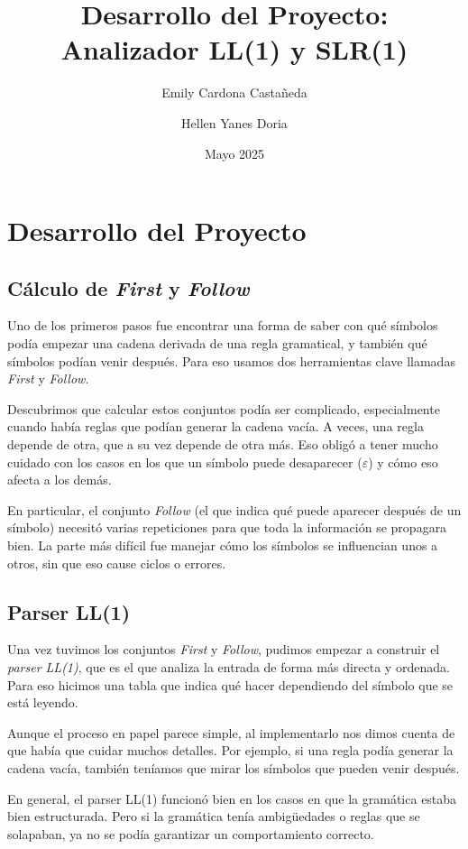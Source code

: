 \documentclass[12pt]{article}
\title{Desarrollo del Proyecto: Analizador LL(1) y SLR(1)}
\author{Emily Cardona Castañeda\and Hellen Yanes Doria}
\date{Mayo 2025}
\begin{document}
\maketitle

\section{Desarrollo del Proyecto}

\subsection{Cálculo de \textit{First} y \textit{Follow}}

Uno de los primeros pasos fue encontrar una forma de saber con qué símbolos podía empezar una cadena derivada de una regla gramatical, y también qué símbolos podían venir después. Para eso usamos dos herramientas clave llamadas \textit{First} y \textit{Follow}. 

Descubrimos que calcular estos conjuntos podía ser complicado, especialmente cuando había reglas que podían generar la cadena vacía. A veces, una regla depende de otra, que a su vez depende de otra más. Eso obligó a tener mucho cuidado con los casos en los que un símbolo puede desaparecer ($\varepsilon$) y cómo eso afecta a los demás.

En particular, el conjunto \textit{Follow} (el que indica qué puede aparecer después de un símbolo) necesitó varias repeticiones para que toda la información se propagara bien. La parte más difícil fue manejar cómo los símbolos se influencian unos a otros, sin que eso cause ciclos o errores.

\subsection{Parser LL(1)}

Una vez tuvimos los conjuntos \textit{First} y \textit{Follow}, pudimos empezar a construir el \textit{parser LL(1)}, que es el que analiza la entrada de forma más directa y ordenada. Para eso hicimos una tabla que indica qué hacer dependiendo del símbolo que se está leyendo.

Aunque el proceso en papel parece simple, al implementarlo nos dimos cuenta de que había que cuidar muchos detalles. Por ejemplo, si una regla podía generar la cadena vacía, también teníamos que mirar los símbolos que pueden venir después.

En general, el parser LL(1) funcionó bien en los casos en que la gramática estaba bien estructurada. Pero si la gramática tenía ambigüedades o reglas que se solapaban, ya no se podía garantizar un comportamiento correcto.
\end{document}
